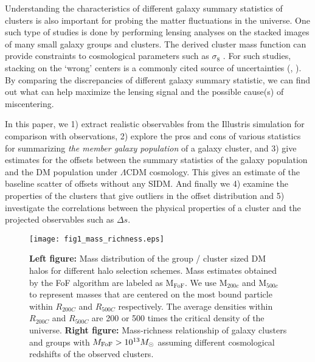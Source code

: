 Understanding the characteristics of different galaxy
summary statistics of clusters is also important for  
probing the matter fluctuations in the universe. 
One such type of studies is done by performing lensing analyses on the stacked images of 
many small galaxy groups and clusters. 
The derived cluster mass function can provide constraints to cosmological
parameters such as $\sigma_8$ \citep{George2012a}. 
For such studies, stacking on the `wrong' centers is a commonly cited
source of uncertainties (\citealt{Johnston2007b},
\citealt{Ford2014}). By comparing the discrepancies of different galaxy
summary statistic, we can find out what can help maximize the lensing signal and 
the possible cause(s) of miscentering. 

In this paper, we 
1) extract realistic observables from the Illustris simulation for
comparison with observations, 2) explore the pros and cons of various statistics for 
summarizing {\it the member galaxy population} of a galaxy cluster, and 3)	
give estimates for the offsets between the summary statistics of the galaxy  
population and the DM population under $\Lambda$CDM cosmology.
This gives
an estimate of the baseline scatter of offsets without any SIDM. And finally we 
4) examine the properties of the clusters that give outliers in 
the offset distribution and 5) investigate the  
correlations between the physical properties of a cluster and the projected 
observables such as $\Delta s$. 
\begin{figure*}
	\texttt{[image: fig1\_mass\_richness.eps]}
	\caption{ {\bf Left figure:} Mass distribution of the group / cluster sized 
		DM halos for different halo selection schemes. Mass estimates obtained by the
		FoF algorithm are labeled as  M$_{\text{FoF}}$.
		We use M$_{200c}$ and M$_{500c}$ to represent 
		masses that are centered on the most bound particle within $R_{200C}$ and
		$R_{500C}$ respectively. The  
		average densities within $R_{200C}$ and $R_{500C}$ are 
		200 or 500 times the critical density of the universe. 
		{\bf Right figure:} 
		Mass-richness relationship of galaxy clusters and groups with 
		$M_{\rm FoF} > 10^{13} M_{\odot}$ assuming different cosmological redshifts
		of the observed clusters. 
\label{fig:mass_richness}}
\end{figure*}

